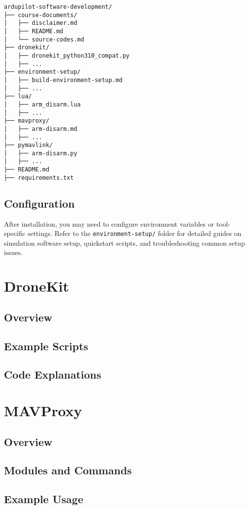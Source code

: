 \documentclass[12pt,a4paper]{report}
\begin{document}
\begin{verbatim}
ardupilot-software-development/
├── course-documents/
│   ├── disclaimer.md
│   ├── README.md
│   └── source-codes.md
├── dronekit/
│   ├── dronekit_python310_compat.py
│   ├── ...
├── environment-setup/
│   ├── build-environment-setup.md
│   ├── ...
├── lua/
│   ├── arm_disarm.lua
│   ├── ...
├── mavproxy/
│   ├── arm-disarm.md
│   ├── ...
├── pymavlink/
│   ├── arm-disarm.py
│   ├── ...
├── README.md
├── requirements.txt
\end{verbatim}

\section{Configuration}
After installation, you may need to configure environment variables or tool-specific settings. Refer to the \texttt{environment-setup/} folder for detailed guides on simulation software setup, quickstart scripts, and troubleshooting common setup issues.


\chapter{DroneKit}
\section{Overview}
\section{Example Scripts}
\section{Code Explanations}

\chapter{MAVProxy}
\section{Overview}
\section{Modules and Commands}
\section{Example Usage}
\end{document}
